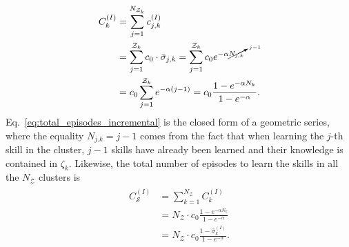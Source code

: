 \begin{align}\label{eq:total_episodes_incremental}
	\begin{split}
		C^{(I)}_k &= \sum^{N_{\mathcal{Z}_k}}_{j=1} c^{(I)}_{j,k}  \\
		&= \sum^{{\mathcal{Z}_k}}_{j=1} c_0 \cdot  \bar{\sigma}_{j,k}  = \sum^{{\mathcal{Z}_k}}_{j=1} c_0 e^{-\alpha {\cancelto{j-1}{N_{j,k}}}}\\
		&= c_0 \sum^{{\mathcal{Z}_k}}_{j=1} e^{-\alpha (j-1)}=c_0 \frac{1 - e^{-\alpha N_k}}{1 - e^{-\alpha}}.
	\end{split}
\end{align}
Eq.~\eqref{eq:total_episodes_incremental} is the closed form of a geometric series, where the equality $N_{j.k} = j-1$ comes from the fact that when learning the $j$-th skill in the cluster, $j-1$ skills have already been learned and their knowledge is contained in $\mathcal{\zeta}_k$. Likewise, the total number of episodes to learn the skills in all the $ N_\mathcal{Z} $ clusters is
%
\begin{align}\label{eq:complexity_incremental_single}
	\begin{split}
		C_\mathcal{S}^{(I)} &= \sum_{k=1}^{N_\mathcal{Z}} C^{(I)}_k\\
		&= N_\mathcal{Z} \cdot c_0 \frac{1 - e^{-\alpha N_k}}{1 - e^{-\alpha}}\\ 
		&= N_\mathcal{Z} \cdot c_0 \frac{1 - \bar{\sigma}_k^{(I)}}{1 - e^{-\alpha}}.
	\end{split}
\end{align}

